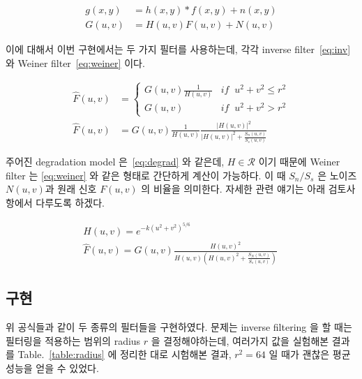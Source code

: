 \documentclass[a4paper, 12p]{paper}
\begin{document}
\begin{align}
  g(x, y) &= h(x, y) * f(x,  y) + n(x, y) \label{eq:degrad} \\
  G(u, v) &= H(u, v) F(u, v) + N(u, v) \label{eq:cplx_degrad}
\end{align}

이에 대해서 이번 구현에서는 두 가지 필터를 사용하는데, 각각 inverse filter~\eqref{eq:inv} 와 Weiner filter~\eqref{eq:weiner} 이다.

\begin{align}
  \hat{F}(u, v) &=
  \begin{cases} 
    G(u, v)\frac{1}{H(u, v)}  & if \;\; u^2 + v^2 \leq r^2 \\
    G(u, v)                   & if \;\; u^2 + v^2  > r^2
  \end{cases} \label{eq:inv} \\
  \hat{F}(u, v) &= G(u, v)\frac{1}{H(u, v)}\frac{|H(u, v)|^2}{|H(u, v)|^2 + \frac{S_n(u, v)}{S_s(u, v)}} \label{eq:weiner}
\end{align}

주어진 degradation model 은~\eqref{eq:degrad} 와 같은데, $H \in \mathcal{R}$ 이기 때문에 Weiner filter 는 \eqref{eq:weiner} 와 같은 형태로 간단하게 계산이 가능하다. 이 때 $S_n/S_s$ 은 노이즈 $N(u, v)$과 원래 신호 $F(u, v)$ 의 비율을 의미한다. 자세한 관련 얘기는 아래 검토사항에서 다루도록 하겠다.

\begin{align}
  H(u, v) = e^{-k {(u^2 + v^2)}^{5/6}} \label{eq:degrad} \\
  \hat{F}(u, v) = G(u, v)\frac{{H(u, v)}^2}{H(u, v)({H(u, v)}^2 + \frac{S_N(u, v)}{S_s(u, v)})} \label{eq:weiner}
  \
\end{align}
 
\subsection{구현}

위 공식들과 같이 두 종류의 필터들을 구현하였다. 문제는 inverse filtering 을 할 때는 필터링을 적용하는 범위의 radius $r$ 을 결정해야하는데, 여러가지 값을 실험해본 결과를 Table.~\ref{table:radius} 에 정리한 대로 시험해본 결과, $r^2 = 64$ 일 때가 괜찮은 평균 성능을 얻을 수 있었다.
\end{document}
